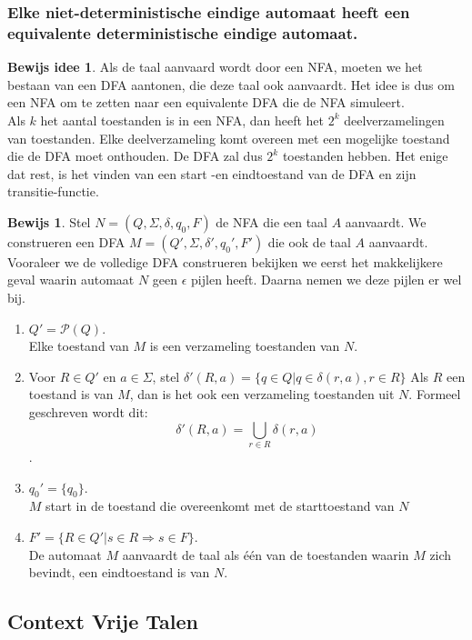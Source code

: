 \documentclass[12pt,a4paper]{article}
\theoremstyle{definition}
\newtheorem{bIdee}{Bewijs idee}[section]
\newtheorem{bewijs}{Bewijs}[section]
\begin{document}
\subsubsection{Elke niet-deterministische eindige automaat heeft een equivalente deterministische eindige automaat.}
\begin{bIdee}
Als de taal aanvaard wordt door een NFA, moeten we het bestaan van een DFA aantonen, die deze taal ook aanvaardt. Het idee is dus om een NFA om te zetten naar een equivalente DFA die de NFA simuleert.\\
Als $k$ het aantal toestanden is in een NFA, dan heeft het $2^k$ deelverzamelingen van toestanden. Elke deelverzameling komt overeen met een mogelijke toestand die de DFA moet onthouden. De DFA zal dus $2^k$ toestanden hebben. Het enige dat rest, is het vinden van een start -en eindtoestand van de DFA en zijn transitie-functie.
\end{bIdee}
\begin{bewijs}
Stel $N = (Q,\Sigma,\delta,q_0,F)$ de NFA die een taal $A$ aanvaardt. We construeren een DFA $M=(Q',\Sigma,\delta',q_0',F')$ die ook de taal $A$ aanvaardt. Vooraleer we de volledige DFA construeren bekijken we eerst het makkelijkere geval waarin automaat $N$ geen $\epsilon$ pijlen heeft. Daarna nemen we deze pijlen er wel bij.
\begin{enumerate}
\item $Q'=\mathcal{P}(Q)$.\\
Elke toestand van $M$ is een verzameling toestanden van $N$.
\item Voor $R\in Q'$ en $a\in \Sigma$, stel $\delta'(R,a) = \{q\in Q|q\in\delta(r,a), r\in R\}$ Als $R$ een toestand is van $M$, dan is het ook een verzameling toestanden uit $N$. Formeel geschreven wordt dit: $$\delta'(R,a) = \bigcup_{r\in R}\delta(r,a)$$.
\item $q_0' = \{q_0\}$.\\
$M$ start in de toestand die overeenkomt met de starttoestand van $N$
\item $F'=\{R\in Q'|s\in R \Rightarrow s\in F\}$.\\
De automaat $M$ aanvaardt de taal als één van de toestanden waarin $M$ zich bevindt, een eindtoestand is van $N$.
\end{enumerate}
\end{bewijs}


\subsection{Context Vrije Talen}
\end{document}
